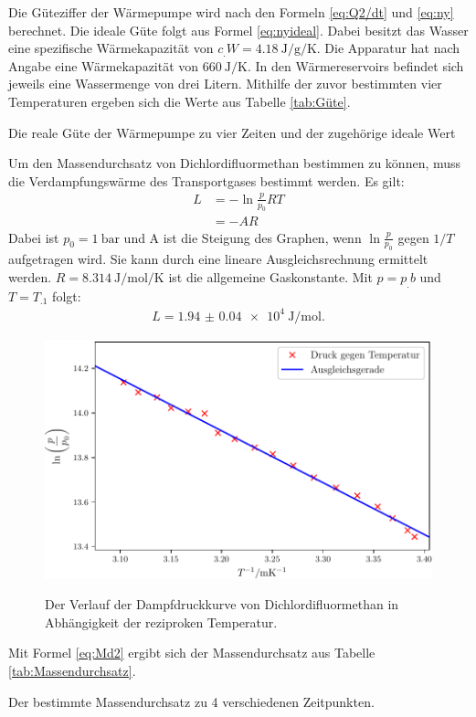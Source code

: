 Die Güteziffer der Wärmepumpe wird nach den Formeln \eqref{eq:Q2/dt} und \eqref{eq:ny} berechnet. Die ideale Güte folgt aus Formel \eqref{eq:nyideal}. 
Dabei besitzt das Wasser eine spezifische Wärmekapazität von $c_.W=\SI{4.18}{\joule\per\gram\per\kelvin}$\cite{V201}. Die Apparatur hat nach Angabe eine Wärmekapazität von $\SI{660}{\joule\per\kelvin}$. In den Wärmereservoirs befindet sich jeweils eine Wassermenge von drei Litern. Mithilfe der zuvor bestimmten vier Temperaturen ergeben sich die Werte aus Tabelle \ref{tab:Güte}. 
\begin{table}
	\centering
	\caption{Die reale Güte der Wärmepumpe zu vier Zeiten und der zugehörige ideale Wert}
 	\label{tab:Güte}
\end{table}
\newline
\noindent Um den Massendurchsatz von Dichlordifluormethan bestimmen zu können, muss die Verdampfungswärme des Transportgases bestimmt werden. Es gilt:
\begin{align*}
 	 L &= -\ln{\frac{p}{p_0}} RT\\
	    &= - A R
\end{align*}
Dabei ist $p_0 = \SI{1}{\bar}$ und A ist die Steigung des Graphen, wenn $\ln{\frac{p}{p_0}}$ gegen $1/T$ aufgetragen wird. Sie kann durch eine lineare Ausgleichsrechnung ermittelt werden. $R = \SI{8.314}{\joule\per\mol\per\kelvin}$ \cite{R} ist die allgemeine Gaskonstante.
Mit $p=p_.b$ und $T=T_.1$ folgt:
\begin{align*}
 	 L = \SI{1.94(4)e+4}{\joule\per\mol}\text{.}
\end{align*}
\begin{figure}
 	\centering
 	\caption{Der Verlauf der Dampfdruckkurve von Dichlordifluormethan in Abhängigkeit der reziproken Temperatur.}
 	\includegraphics[width=\linewidth-70pt,height=\textheight-70pt,keepaspectratio]{content/images/Dampfdruck.pdf}
 	\label{fig:Dampfdruck}
\end{figure}
\newline
\noindent Mit Formel \eqref{eq:Md2} ergibt sich der Massendurchsatz aus Tabelle \ref{tab:Massendurchsatz}.
 \begin{table}
   	\centering
   	\caption{Der bestimmte Massendurchsatz zu 4 verschiedenen Zeitpunkten.}
   	\label{tab:Massendurchsatz}
 \end{table}

